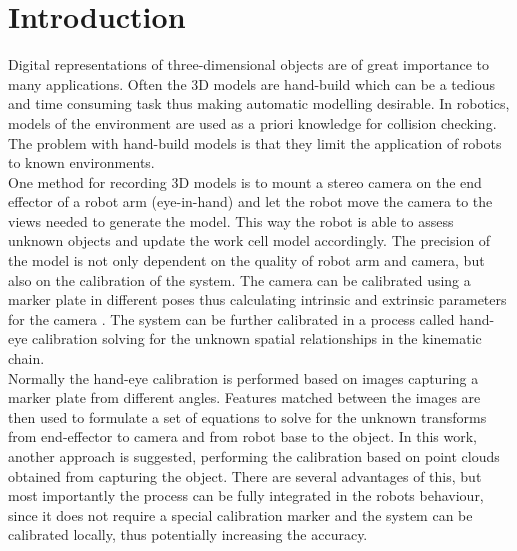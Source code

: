 \chapter{Introduction}
Digital representations of three-dimensional objects are of great importance to many applications. Often the 3D models are hand-build which can be a tedious and time consuming task thus making automatic modelling desirable. In robotics, models of the environment are used as a priori knowledge for collision checking. The problem with hand-build models is that they limit the application of robots to known environments. \\

One method for recording 3D models is to mount a stereo camera on the end effector of a robot arm (eye-in-hand) and let the robot move the camera to the views needed to generate the model. This way the robot is able to assess unknown objects and update the work cell model accordingly. The precision of the model is not only dependent on the quality of robot arm and camera, but also on the calibration of the system. The camera can be calibrated using a marker plate in different poses thus calculating intrinsic and extrinsic parameters for the camera \cite{Zhang2000}. The system can be further calibrated in a process called hand-eye calibration solving for the unknown spatial relationships in the kinematic chain.\\


Normally the hand-eye calibration is performed based on images capturing a marker plate from different angles. Features matched between the images are then used to formulate a set of equations to solve for the unknown transforms from end-effector to camera and from robot base to the object. In this work, another approach is suggested, performing the calibration based on point clouds obtained from capturing the object. There are several advantages of this, but most importantly the process can be fully integrated in the robots behaviour, since it does not require a special calibration marker and the system can be calibrated locally, thus potentially increasing the accuracy.\\


